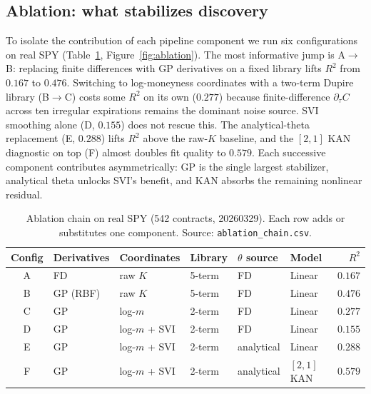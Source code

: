 \documentclass[10pt]{article}
\begin{document}
\subsection{Ablation: what stabilizes discovery}\label{sec:ablation}

To isolate the contribution of each pipeline component we run six configurations on real SPY (Table~\ref{tab:ablation}, Figure~\ref{fig:ablation}). The most informative jump is A$\to$B: replacing finite differences with GP derivatives on a fixed library lifts $R^2$ from $0.167$ to $0.476$. Switching to log-moneyness coordinates with a two-term Dupire library (B$\to$C) costs some $R^2$ on its own ($0.277$) because finite-difference $\partial_\tau C$ across ten irregular expirations remains the dominant noise source. SVI smoothing alone (D, $0.155$) does not rescue this. The analytical-theta replacement (E, $0.288$) lifts $R^2$ above the raw-$K$ baseline, and the $[2,1]$ KAN diagnostic on top (F) almost doubles fit quality to $0.579$. Each successive component contributes asymmetrically: GP is the single largest stabilizer, analytical theta unlocks SVI's benefit, and KAN absorbs the remaining nonlinear residual.

\begin{table}[h]
\centering\footnotesize
\caption{Ablation chain on real SPY (542 contracts, 20260329). Each row adds or substitutes one component. Source: \texttt{ablation\_chain.csv}.}
\label{tab:ablation}
\begin{tabular}{clllllr}
\toprule
Config & Derivatives & Coordinates & Library & $\theta$ source & Model & $R^2$ \\
\midrule
A & FD       & raw $K$           & 5-term & FD         & Linear       & $0.167$ \\
B & GP (RBF) & raw $K$           & 5-term & FD         & Linear       & $0.476$ \\
C & GP       & log-$m$           & 2-term & FD         & Linear       & $0.277$ \\
D & GP       & log-$m$ + SVI     & 2-term & FD         & Linear       & $0.155$ \\
E & GP       & log-$m$ + SVI     & 2-term & analytical & Linear       & $0.288$ \\
F & GP       & log-$m$ + SVI     & 2-term & analytical & $[2,1]$ KAN  & $\mathbf{0.579}$ \\
\bottomrule
\end{tabular}
\end{table}
\end{document}
